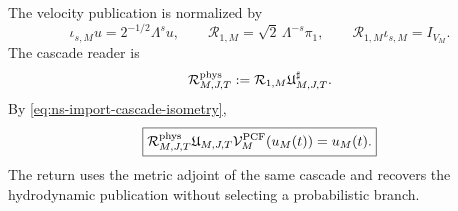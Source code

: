 The velocity publication is normalized by
\begin{equation}
 \iota_{s,M}u=2^{-1/2}\Lambda^su,
 \qquad
 \mathcal R_{1,M}=\sqrt2\,\Lambda^{-s}\pi_1,
 \qquad
 \mathcal R_{1,M}\iota_{s,M}=I_{V_M}.
 \label{eq:ns-import-grade-one-return}
\end{equation}
The cascade reader is
\begin{equation}
 \mathcal R_{M,J,T}^{\rm phys}
 :=\mathcal R_{1,M}\mathfrak U_{M,J,T}^{\sharp}.
 \label{eq:ns-import-full-return}
\end{equation}
By \eqref{eq:ns-import-cascade-isometry},
\begin{equation}
 \boxed{
 \mathcal R_{M,J,T}^{\rm phys}
 \mathfrak U_{M,J,T}\mathcal V_M^{\rm PCF}(u_M(t))
 =u_M(t).}
 \label{eq:ns-import-exact-return}
\end{equation}
The return uses the metric adjoint of the same cascade and recovers the hydrodynamic publication without selecting a probabilistic branch.
